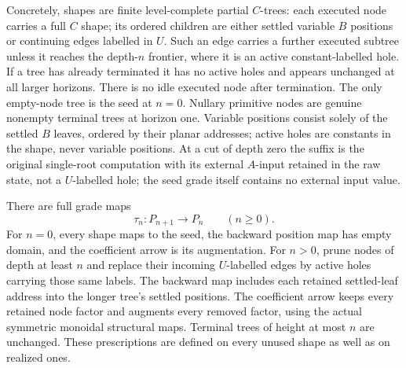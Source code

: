 \documentclass[11pt]{article}
\begin{document}
Concretely, shapes are finite level-complete partial $C$-trees: each executed node carries a full $C$ shape; its ordered children are either settled variable $B$ positions or continuing edges labelled in $U$. Such an edge carries a further executed subtree unless it reaches the depth-$n$ frontier, where it is an active constant-labelled hole. If a tree has already terminated it has no active holes and appears unchanged at all larger horizons. There is no idle executed node after termination. The only empty-node tree is the seed at $n=0$. Nullary primitive nodes are genuine nonempty terminal trees at horizon one. Variable positions consist solely of the settled $B$ leaves, ordered by their planar addresses; active holes are constants in the shape, never variable positions. At a cut of depth zero the suffix is the original single-root computation with its external $A$-input retained in the raw state, not a $U$-labelled hole; the seed grade itself contains no external input value.

There are full grade maps
\[
 \tau_n:P_{n+1}\longrightarrow P_n\qquad(n\geq0).          \tag{2}
\]
For $n=0$, every shape maps to the seed, the backward position map has empty domain, and the coefficient arrow is its augmentation. For $n>0$, prune nodes of depth at least $n$ and replace their incoming $U$-labelled edges by active holes carrying those same labels. The backward map includes each retained settled-leaf address into the longer tree's settled positions. The coefficient arrow keeps every retained node factor and augments every removed factor, using the actual symmetric monoidal structural maps. Terminal trees of height at most $n$ are unchanged. These prescriptions are defined on every unused shape as well as on realized ones.
\end{document}
